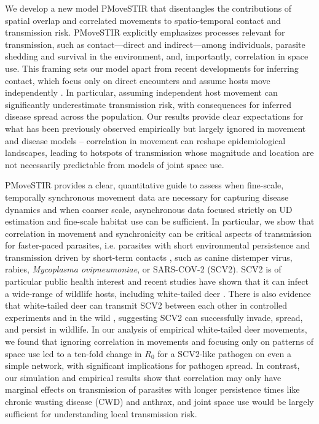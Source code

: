 \documentclass[letterpaper]{article}
\begin{document}
We develop a new model PMoveSTIR that disentangles the contributions of spatial overlap and correlated movements to spatio-temporal contact and transmission risk.  PMoveSTIR explicitly emphasizes processes relevant for transmission, such as contact---direct and indirect---among individuals, parasite shedding and survival in the environment, and, importantly, correlation in space use. 
This framing sets our model apart from recent developments for inferring contact, which focus only on direct encounters and assume hosts move independently \citep{Noonan2021,Das2023}.  In particular, assuming independent host movement can significantly underestimate transmission risk, with consequences for inferred disease spread across the population. Our results provide clear expectations for what has been previously observed empirically but largely ignored in movement and disease models -- correlation in movement can reshape epidemiological landscapes, leading to hotspots of transmission whose magnitude and location are not necessarily predictable from models of joint space use.

PMoveSTIR provides a clear, quantitative guide to assess when fine-scale, temporally synchronous movement data are necessary for capturing disease dynamics and when coarser scale, asynchronous data focused strictly on UD estimation and fine-scale habitat use can be sufficient. 
In particular, we show that correlation in movement and synchronicity can be critical aspects of transmission for faster-paced parasites, i.e. parasites with short environmental persistence and transmission driven by short-term contacts \citep[cf.][]{Dougherty2018,Manlove2022}, such as canine distemper virus, rabies, \emph{Mycoplasma ovipneumoniae}, or SARS-COV-2 (SCV2). 
SCV2 is of particular public health interest and recent studies have shown that it can infect a wide-range of wildlife hosts, including white-tailed deer \citep{Palmer2021,Hale2022}. There is also evidence that white-tailed deer can transmit SCV2 between each other in controlled experiments and in the wild \citep{Martins2022,Hale2022}, suggesting SCV2 can successfully invade, spread, and persist in wildlife.  In our analysis of empirical white-tailed deer movements, we found that ignoring correlation in movements and focusing only on patterns of space use led to a ten-fold change in $R_0$ for a SCV2-like pathogen on even a simple network, with significant implications for pathogen spread.  In contrast, our simulation and empirical results show that correlation may only have marginal effects on transmission of parasites with longer persistence times like chronic wasting disease (CWD) and anthrax, and joint space use would be largely sufficient for understanding local transmission risk.
\end{document}
